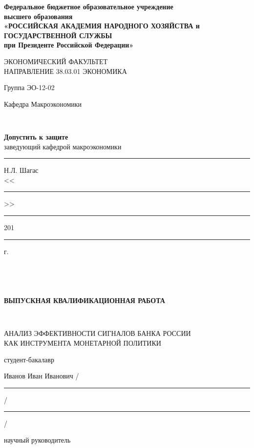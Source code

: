 \documentclass[14pt,a4paper, oneside]{extreport}
\newcounter{notes}
\theoremstyle{plain}              %
\theoremstyle{definition}         %
\begin{document}
    \pagestyle{fancy}
    \renewcommand{\headrulewidth}{0pt}
    \thispagestyle{empty}




\begin{titlepage}
\begin{center}
\small \bfseries Федеральное бюджетное образовательное учреждение \\
высшего образования\\
«РОССИЙСКАЯ АКАДЕМИЯ НАРОДНОГО ХОЗЯЙСТВА и\\
ГОСУДАРСТВЕННОЙ СЛУЖБЫ\\
при Президенте Российской Федерации»

\vspace{2ex}

ЭКОНОМИЧЕСКИЙ ФАКУЛЬТЕТ\\
НАПРАВЛЕНИЕ 38.03.01 ЭКОНОМИКА
\end{center}



\vfill


\noindent\small Группа ЭО-12-02


\hfill\parbox{0.45\linewidth}{
\parbox[t]{20em}{\centering\small
Кафедра Макроэкономики

\mbox{ }

\textbf{Допустить к защите}\\
заведующий кафедрой макроэкономики\\
\rule{8em}{0.5pt} Н.Л. Шагас\\
<<\rule{2em}{0.5pt}>> \rule{5em}{0.5pt} 201\rule{1em}{0.5pt} г. }}

\mbox{ }

\mbox{ }


\begin{center}\bfseries
ВЫПУСКНАЯ КВАЛИФИКАЦИОННАЯ РАБОТА

\mbox{ }

\large АНАЛИЗ ЭФФЕКТИВНОСТИ СИГНАЛОВ БАНКА РОССИИ\\
КАК ИНСТРУМЕНТА МОНЕТАРНОЙ ПОЛИТИКИ

\end{center}

\vfill


\noindent\normalsize
студент-бакалавр

\noindent
Иванов Иван Иванович
\hfill /\rule{6em}{0.5pt}/\rule{6em}{0.5pt}/

\hfill{}

\noindent
научный руководитель 


\end{titlepage}
\end{document}
